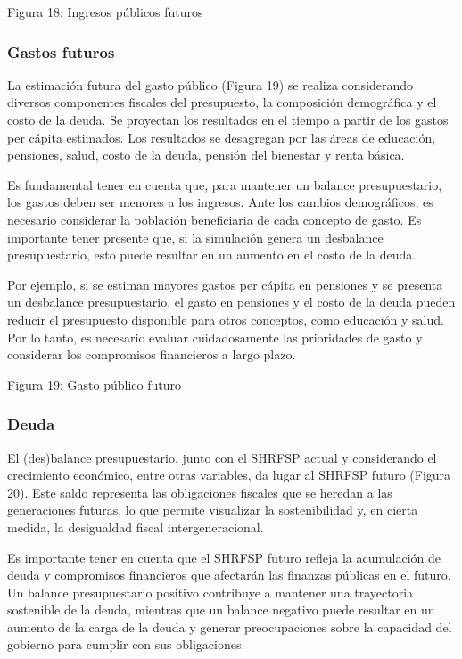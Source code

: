 Figura 18: Ingresos públicos futuros


\hypertarget{gastos-futuros}{%
\subsubsection{Gastos futuros}\label{gastos-futuros}}

La estimación futura del gasto público (Figura 19) se realiza
considerando diversos componentes fiscales del presupuesto, la
composición demográfica y el costo de la deuda. Se proyectan los
resultados en el tiempo a partir de los gastos per cápita estimados. Los
resultados se desagregan por las áreas de educación, pensiones, salud,
costo de la deuda, pensión del bienestar y renta básica.

Es fundamental tener en cuenta que, para mantener un balance
presupuestario, los gastos deben ser menores a los ingresos. Ante los
cambios demográficos, es necesario considerar la población beneficiaria
de cada concepto de gasto. Es importante tener presente que, si la
simulación genera un desbalance presupuestario, esto puede resultar en
un aumento en el costo de la deuda.

Por ejemplo, si se estiman mayores gastos per cápita en pensiones y se
presenta un desbalance presupuestario, el gasto en pensiones y el costo
de la deuda pueden reducir el presupuesto disponible para otros
conceptos, como educación y salud. Por lo tanto, es necesario evaluar
cuidadosamente las prioridades de gasto y considerar los compromisos
financieros a largo plazo.

Figura 19: Gasto público futuro


\hypertarget{deuda}{%
\subsubsection{Deuda}\label{deuda}}

El (des)balance presupuestario, junto con el SHRFSP actual y
considerando el crecimiento económico, entre otras variables, da lugar
al SHRFSP futuro (Figura 20). Este saldo representa las obligaciones
fiscales que se heredan a las generaciones futuras, lo que permite
visualizar la sostenibilidad y, en cierta medida, la desigualdad fiscal
intergeneracional.

Es importante tener en cuenta que el SHRFSP futuro refleja la
acumulación de deuda y compromisos financieros que afectarán las
finanzas públicas en el futuro. Un balance presupuestario positivo
contribuye a mantener una trayectoria sostenible de la deuda, mientras
que un balance negativo puede resultar en un aumento de la carga de la
deuda y generar preocupaciones sobre la capacidad del gobierno para
cumplir con sus obligaciones.

